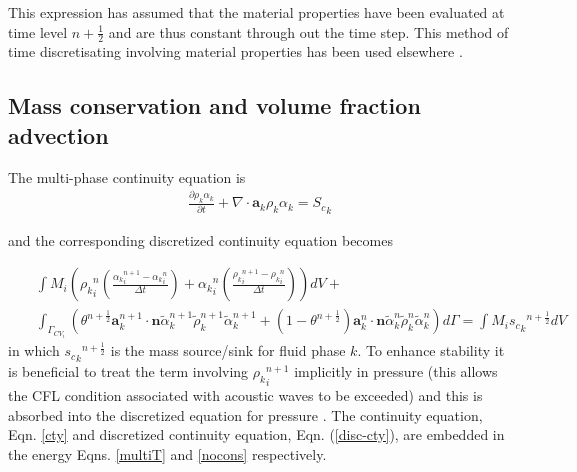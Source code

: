 This expression has assumed that the material properties have been evaluated at time level ${n+{\frac{1}{2}}}$ and are thus constant through out the time step. This method of time discretisating 
involving material properties has been used elsewhere \cite{ChrisNSE}.




\subsection{Mass conservation and volume fraction advection} 

The multi-phase continuity equation is
\begin{eqnarray}
\frac{\partial \rho_k\alpha_k}{\partial t}
+ \nabla \cdot \mathbf{a}_k \rho_k \alpha_k = {S_c}_k
\label{cty}
\end{eqnarray}

and the corresponding discretized continuity equation becomes

\begin{eqnarray}
&&\int M_{i}  \left( {\rho_k}_{i}^{n}
\left(\displaystyle\frac{{\alpha_k}_{i}^{n+1}-{\alpha_k}_{i}^{n}}{\Delta
t}\right) + {\alpha_k}_{i}^{n}
\left(\displaystyle\frac{{\rho_k}_{i}^{n+1}-{\rho_k}_{i}^{n}}{\Delta
t}\right) \right)dV + \nonumber\\
&&\int_{\Gamma_{CV_{i}}}\left( \theta^{n+\frac{1}{2}}
 \mathbf{a}^{n+1}_k \cdot \mathbf{n}\widetilde{\alpha}_k^{n+1} \widetilde{\rho}_k^{n+1}
\widetilde{\alpha}^{n+1}_k
+
(1-\theta^{n+\frac{1}{2}} )
 \mathbf{a}^{n}_k \cdot \mathbf{n}\widetilde{\alpha}_k^{n} \widetilde{\rho}_k^{n}
\widetilde{\alpha}^{n}_k
  \right) d\Gamma
=
\int M_{i} {{s_c}_k}^{n+\frac{1}{2}} dV
\label{disc-cty}
\end{eqnarray}
in which ${{s_c}_k}^{n+\frac{1}{2}}$ is the mass source/sink for fluid phase $k$. To enhance stability it is beneficial to treat the term involving ${\rho_k}_i^{n+1}$ implicitly in pressure (this allows the CFL condition associated with acoustic waves to be exceeded) and this is absorbed into the discretized equation for pressure \citep[see][for more details]{pain_2001b}.  The continuity equation, Eqn. \ref{cty} and discretized continuity equation, Eqn. (\ref{disc-cty}), are embedded in the energy Eqns. \ref{multiT} and \ref{nocons} respectively.



